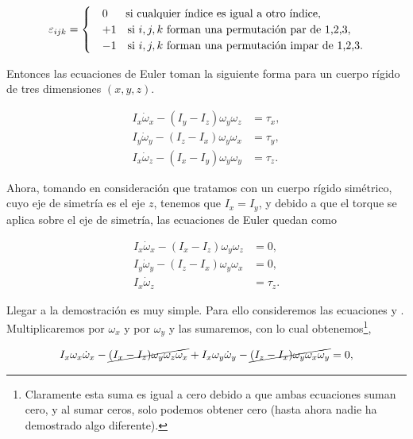 \documentclass[a4paper,10pt]{article}
\numberwithin{equation}{section}
\begin{document}
\begin{align*}
 \varepsilon_{ijk} = \left\{\def\arraystretch{1.2}%
  \begin{array}{@{}c@{\quad}l@{}}
     &0 \quad \text{\hspace{.1cm} si cualquier índice es igual a otro índice}, \\
    &+1 \quad \text{si $i,j,k$ forman una permutación par de 1,2,3}, \\
    &-1 \quad \text{si $i,j,k$ forman una permutación impar de 1,2,3}.
  \end{array}\right.
\end{align*}

Entonces las ecuaciones de Euler toman la siguiente forma para un cuerpo rígido
de tres dimensiones $(x,y,z)$.

\begin{align}
 I_x \dot{\omega}_x - (I_y - I_z)\omega_y\omega_z &= \tau_x, \\
 I_y \dot{\omega}_y - (I_z - I_x)\omega_y\omega_x &= \tau_y, \\
 I_x \dot{\omega}_z - (I_x - I_y)\omega_y\omega_y &= \tau_z.
\end{align}

Ahora, tomando en consideración que tratamos con un cuerpo rígido simétrico, cuyo eje 
de simetría es el eje $z$, tenemos que $I_x = I_y$, y debido a que el torque se aplica
sobre el eje de simetría, las ecuaciones de Euler quedan como

\begin{align}
\label{eq:rigid1}
 I_x \dot{\omega}_x - (I_x - I_z)\omega_y\omega_z &= 0, \\
\label{eq:rigid2}
 I_y \dot{\omega}_y - (I_z - I_x)\omega_y\omega_x &= 0, \\
 I_x \dot{\omega}_z &= \tau_z.
\end{align}

Llegar a la demostración es muy simple. Para ello consideremos las ecuaciones  
y . Multiplicaremos  por $\omega_x$ y  por
$\omega_y$ y las sumaremos, con lo cual obtenemos\footnote{Claramente esta suma es 
igual a cero debido a que ambas ecuaciones suman cero, y al sumar ceros, solo
podemos obtener cero (hasta ahora nadie ha demostrado algo diferente).},

\begin{equation}
 I_x \omega_x \dot{\omega}_x - \cancel{(I_x - I_z)\omega_y\omega_z\omega_x}  + 
 I_x \omega_y \dot{\omega}_y - \cancel{(I_z - I_x)\omega_y\omega_x\omega_y} = 0,
\end{equation}
\end{document}

